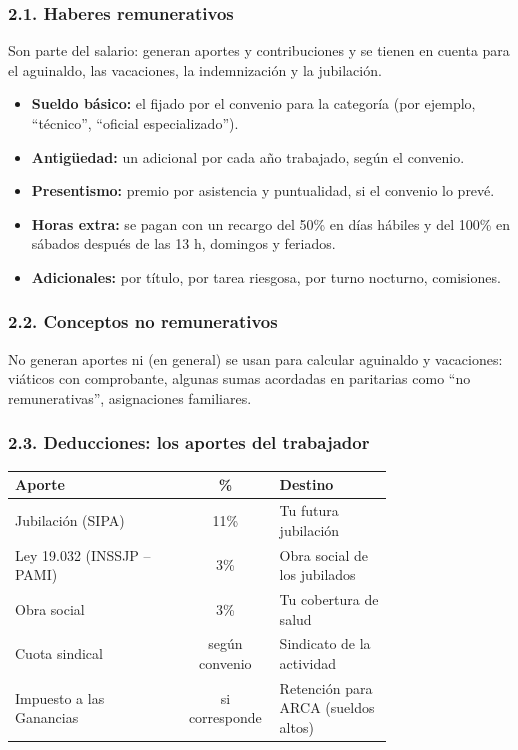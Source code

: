 \subsubsection*{2.1. Haberes remunerativos}
Son parte del salario: generan aportes y contribuciones y se tienen en cuenta para el
aguinaldo, las vacaciones, la indemnización y la jubilación.
\begin{itemize}
  \item \textbf{Sueldo básico:} el fijado por el convenio para la categoría (por ejemplo,
        ``técnico'', ``oficial especializado'').
  \item \textbf{Antigüedad:} un adicional por cada año trabajado, según el convenio.
  \item \textbf{Presentismo:} premio por asistencia y puntualidad, si el convenio lo prevé.
  \item \textbf{Horas extra:} se pagan con un recargo del 50\% en días hábiles y del 100\% en
        sábados después de las 13 h, domingos y feriados.
  \item \textbf{Adicionales:} por título, por tarea riesgosa, por turno nocturno, comisiones.
\end{itemize}

\subsubsection*{2.2. Conceptos no remunerativos}
No generan aportes ni (en general) se usan para calcular aguinaldo y vacaciones: viáticos con
comprobante, algunas sumas acordadas en paritarias como ``no remunerativas'', asignaciones
familiares.

\subsubsection*{2.3. Deducciones: los aportes del trabajador}
\begin{center}
\small
\begin{tabular}{|p{0.45\linewidth}|c|p{0.30\linewidth}|}
\hline
\textbf{Aporte} & \textbf{\%} & \textbf{Destino} \\ \hline
Jubilación (SIPA) & 11\% & Tu futura jubilación \\ \hline
Ley 19.032 (INSSJP -- PAMI) & 3\% & Obra social de los jubilados \\ \hline
Obra social & 3\% & Tu cobertura de salud \\ \hline
Cuota sindical & según convenio & Sindicato de la actividad \\ \hline
Impuesto a las Ganancias & si corresponde & Retención para ARCA (sueldos altos) \\ \hline
\end{tabular}
\end{center}

